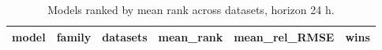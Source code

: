 \begin{table}
\caption{Models ranked by mean rank across datasets, horizon 24 h.}
\label{tab:cross24}
\begin{tabular}{llrrrr}
\toprule
model & family & datasets & mean_rank & mean_rel_RMSE & wins \\
\midrule
\bottomrule
\end{tabular}
\end{table}

